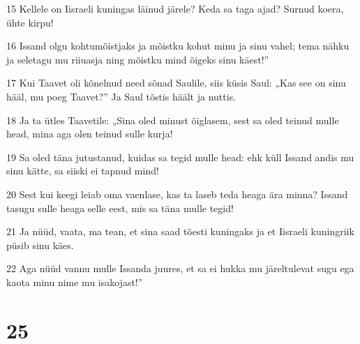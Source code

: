\par 15 Kellele on Iisraeli kuningas läinud järele? Keda sa taga ajad? Surnud koera, ühte kirpu!
\par 16 Issand olgu kohtumõistjaks ja mõistku kohut minu ja sinu vahel; tema nähku ja seletagu mu riiuasja ning mõistku mind õigeks sinu käest!”
\par 17 Kui Taavet oli kõnelnud need sõnad Saulile, siis küsis Saul: „Kas see on sinu hääl, mu poeg Taavet?” Ja Saul tõstis häält ja nuttis.
\par 18 Ja ta ütles Taavetile: „Sina oled minust õiglasem, sest sa oled teinud mulle head, mina aga olen teinud sulle kurja!
\par 19 Sa oled täna jutustanud, kuidas sa tegid mulle head: ehk küll Issand andis mu sinu kätte, sa siiski ei tapnud mind!
\par 20 Sest kui keegi leiab oma vaenlase, kas ta laseb teda heaga ära minna? Issand tasugu sulle heaga selle eest, mis sa täna mulle tegid!
\par 21 Ja nüüd, vaata, ma tean, et sina saad tõesti kuningaks ja et Iisraeli kuningriik püsib sinu käes.
\par 22 Aga nüüd vannu mulle Issanda juures, et sa ei hukka mu järeltulevat sugu ega kaota minu nime mu isakojast!”

\chapter{25}


